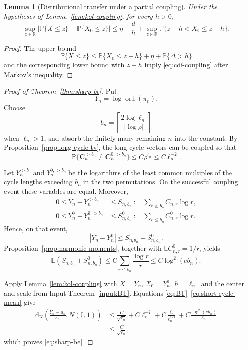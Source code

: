 \documentclass[11pt]{article}
\newtheorem{lemma}[theorem]{Lemma}
\theoremstyle{definition}
\theoremstyle{remark}
\newcommand{\Pp}{\mathbb P}
\newcommand{\Ee}{\mathbb E}
\newcommand{\ord}{\operatorname{ord}}
\newcommand{\Kol}{\mathrm d_{\mathrm K}}
\newcommand{\R}{\mathbb R}
\begin{document}
\begin{lemma}[Distributional transfer under a partial coupling]
\label{lem:cdf-coupling}
Under the hypotheses of Lemma~\ref{lem:kol-coupling}, for every $h>0$,
\begin{equation}\label{eq:cdf-coupling}
 \sup_{z\in\R}|\Pp\{X\le z\}-\Pp\{X_0\le z\}|
 \le
 \eta+\frac{d}{h}
 +\sup_{z\in\R}\Pp\{z-h<X_0\le z+h\}.
\end{equation}
\end{lemma}

\begin{proof}
The upper bound
\[
 \Pp\{X\le z\}
 \le
 \Pp\{X_0\le z+h\}+\eta+\Pp\{\Delta>h\}
\]
and the corresponding lower bound with $z-h$ imply
\eqref{eq:cdf-coupling} after Markov's inequality.
\end{proof}

\begin{proof}[Proof of Theorem~\ref{thm:sharp-be}]
Put
\[
 Y_n=\log\ord(\pi_n).
\]
Choose
\[
 b_n=
 \left\lceil\frac{2\log\ell_n}{|\log\rho|}\right\rceil
\]
when $\ell_n>1$, and absorb the finitely many remaining $n$ into the
constant.  By Proposition~\ref{prop:long-cycle-tv}, the long-cycle vectors
can be coupled so that
\begin{equation}\label{eq:coupling-failure}
 \Pp\{\mathbf C_n^{>b_n}\ne\mathbf C_n^{0,>b_n}\}
 \le C\rho^{b_n}\le C\ell_n^{-2}.
\end{equation}

Let $Y_n^{>b_n}$ and $Y_n^{0,>b_n}$ be the logarithms of the least common
multiples of the cycle lengths exceeding $b_n$ in the two permutations.
On the successful coupling event these variables are equal.  Moreover,
\begin{align*}
 0\le Y_n-Y_n^{>b_n}
 &\le S_{n,b_n}:=\sum_{r\le b_n}C_{n,r}\log r,\\
 0\le Y_n^0-Y_n^{0,>b_n}
 &\le S^0_{n,b_n}:=\sum_{r\le b_n}C^0_{n,r}\log r.
\end{align*}
Hence, on that event,
\[
 |Y_n-Y_n^0|\le S_{n,b_n}+S^0_{n,b_n}.
\]
Proposition~\ref{prop:harmonic-moments}, together with
$\Ee C^0_{n,r}=1/r$, yields
\begin{equation}\label{eq:short-cycle-mean}
 \Ee(S_{n,b_n}+S^0_{n,b_n})
 \le C\sum_{r\le b_n}\frac{\log r}{r}
 \le C\log^2(e b_n).
\end{equation}

Apply Lemma~\ref{lem:kol-coupling} with $X=Y_n$, $X_0=Y_n^0$,
$h=\ell_n$, and the center and scale from
Input Theorem~\ref{input:BT}.  Equations
\eqref{eq:BT}--\eqref{eq:short-cycle-mean} give
\begin{align*}
 \Kol\!\left(\frac{Y_n-a_n}{s_n},N(0,1)\right)
 &\le
 \frac{C}{\sqrt{\ell_n}}
 +C\ell_n^{-2}
 +C\frac{\ell_n}{\ell_n^{3/2}}
 +C\frac{\log^2(e b_n)}{\ell_n}\\
 &\le \frac{C}{\sqrt{\ell_n}},
\end{align*}
which proves \eqref{eq:sharp-be}.
\end{proof}
\end{document}
